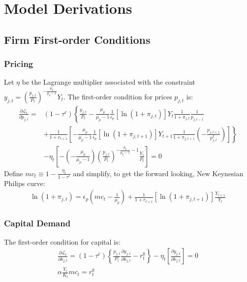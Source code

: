 


\section{Model Derivations}


\subsection{Firm First-order Conditions}
\subsubsection{Pricing}
Let $\eta$ be the Lagrange multiplier associated with the constraint $y_{j,t}=\left(\frac{p_{j,t}}{P_{t}}\right)^{-\frac{\mu_{p}}{\mu_{p}-1}}Y_{t}$. The first-order condition for prices $p_{j,t}$ is:
\begin{align*} 
\frac{\partial\mathcal{L}_{t}}{\partial p_{j,t}}=&\left(1-\tau^{c}\right)\left\{ \frac{y_{j,t}}{P_{t}}-\frac{\mu_{p}}{\mu_{p}-1}\frac{1}{\epsilon_{p}}\left[\ln\left(1+\pi_{j,t}\right)\right]Y_{t}\frac{1}{1+\pi_{j,t}}\frac{1}{p_{j,t-1}}\right. \\
&+\left.\frac{1}{1+r_{t+1}}\left[-\frac{\mu_{p}}{\mu_{p}-1}\frac{1}{\epsilon_{p}}\left[\ln\left(1+\pi_{j,t+1}\right)\right]Y_{t+1}\frac{1}{1+\pi_{j,t+1}}\left(-\frac{p_{j,t+1}}{p_{j,t}^{2}}\right)\right]\right\} \\
&-\eta_{t}\left[-\left(-\frac{\mu_{p}}{\mu_{p}-1}\right)\left(\frac{p_{j,t}}{P_{t}}\right)^{-\frac{\mu_{p}}{\mu_{p}-1}-1}\frac{Y_{t}}{P_{t}}\right]=0
\end{align*}
Define $mc_{t}\equiv 1-\frac{\eta_{t}}{1-\tau^{c}}$ and simplify, to get the forward looking, New Keynesian Philips curve:
\begin{align*} 
\ln\left(1+\pi_{j,t}\right)=\epsilon_{p}\left(mc_{t}-\frac{1}{\mu_{p}}\right)+\frac{1}{1+r_{t+1}}\left[\ln\left(1+\pi_{j,t+1}\right)\right]\frac{Y_{t+1}}{Y_{t}}
\end{align*}


\subsubsection{Capital Demand}
The first-order condition for capital is:
\begin{gather*}
\frac{\partial\mathcal{L}_{t}}{\partial k_{j,t}}=\left(1-\tau^{c}\right)\left\{ \frac{p_{j,t}}{P_{t}}\frac{\partial y_{j,t}}{\partial k_{j,t}}-r_{t}^{k}\right\} -\eta_{t}\left[\frac{\partial y_{j,t}}{\partial k_{j,t}}\right]=0 \\
\alpha\frac{Y_{t}}{K_{t}}mc_{t}=r_{t}^{k}
\end{gather*}


